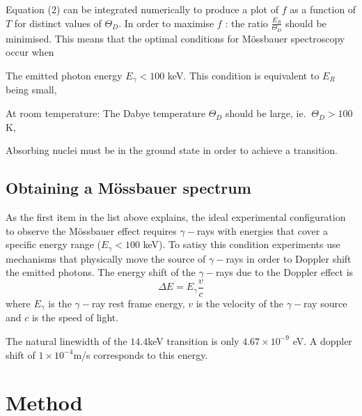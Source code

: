 \documentclass[a4paper, twocolumn]{article}
\newenvironment{itemizeReduced}{
\begin{list}{\labelitemi}{\leftmargin=1em}
\setlength{\itemsep}{1pt}
\setlength{\parskip}{0pt}
\setlength{\parsep}{0pt}}{\end{list}
}
\begin{document}
Equation (2) can be integrated numerically to produce a plot of $f$ as a function of $T$ for distinct values of $\Theta_D$\cite{8}.
In order to maximise $f$ : the ratio $\frac{E_R}{\Theta_D}$ should be minimised\cite{8}. 
This means that the optimal conditions for Mössbauer spectroscopy occur when 
\begin{itemizeReduced}
    \item The emitted photon energy $E_{\gamma} < 100$ keV. This condition is equivalent to $E_R$ being small,
    \item At room temperature: The Dabye temperature $\Theta_D$ should be large, ie. $~\Theta_D > 100$ K\cite{13},
    \item Absorbing nuclei must be in the ground state in order to achieve a transition\cite{10}\cite{13}.
\end{itemizeReduced}

\subsection{Obtaining a Mössbauer spectrum}
As the first item in the list above explains, the ideal experimental configuration to observe the Mössbauer effect requires $\gamma-$rays with energies that cover a specific energy range ($E_{\gamma} < 100$ keV). To satisy this condition experiments use mechanisms that physically move the source of $\gamma-$rays in order to Doppler shift the emitted photons\cite{10}. The energy shift of the $\gamma-$rays due to the Doppler effect is
\begin{equation} \Delta E = E_{\gamma} \frac{v}{c}
\end{equation}
where $E_{\gamma}$ is the $\gamma-$ray rest frame energy, $v$ is the velocity of the $\gamma-$ray source and $c$ is the speed of light.

The natural linewidth of the $14.4$keV transition is only $4.67 \times 10^{-9}$ eV\cite{0}. A doppler shift of $1\times10^{-4}$m/s corresponds to this energy\cite{0}.



\section{Method}
\end{document}
